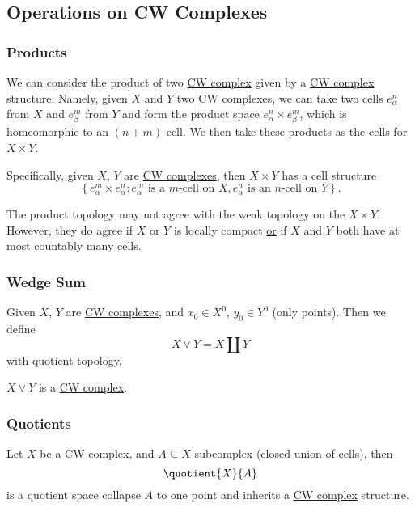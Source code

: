 \subsection{Operations on CW Complexes}
\subsubsection{Products}\label{sssec:Products}
We can consider the product of two \hyperref[def:CW-Complex]{CW complex} given by a \hyperref[def:CW-Complex]{CW complex} structure. Namely, given \(X\) and \(Y\)
two \hyperref[def:CW-Complex]{CW complexes}, we can take two cells \(e^n_{\alpha }\) from \(X\) and \(e^m_{\beta }\) from \(Y\) and
form the product space \(e^n_{\alpha }\times e^m_{\beta }\), which is homeomorphic to an \((n+m)\)-cell. We then
take these products as the cells for \(X\times Y\).

Specifically, given \(X\), \(Y\) are \hyperref[def:CW-Complex]{CW complexes}, then \(X\times Y\) has a cell structure
\[
	\left\{e_{\alpha}^m \times e_{\alpha}^n\colon e^m_{\alpha}\text{ is a \(m\)-cell on \(X\)}, e^n_{\alpha}\text{ is an \(n\)-cell on \(Y\)}\right\}.
\]
\begin{remark}
	The product topology may not agree with the weak topology on the \(X\times Y\). However, they do agree if
	\(X\) or \(Y\) is locally compact \underline{or} if \(X\) and \(Y\) both have at most countably many cells.
\end{remark}

\subsubsection{Wedge Sum}\label{sssec:Wedge-sum}
Given \(X\), \(Y\) are \hyperref[def:CW-Complex]{CW complexes}, and \(x_0\in X^0\), \(y_0\in Y^0\) (only points). Then we define
\[
	X\vee Y = X\coprod Y
\]
with quotient topology.
\begin{remark}
	\(X\lor Y\) is a \hyperref[def:CW-Complex]{CW complex}.
\end{remark}

\subsubsection{Quotients}\label{sssec:Quotients}
Let \(X\) be a \hyperref[def:CW-Complex]{CW complex}, and \(A\subseteq X\) \hyperref[def:CW-subcomplex]{subcomplex} (closed union of cells), then
\[
	\quotient{X}{A}
\]
is a quotient space collapse \(A\) to one point and inherits a \hyperref[def:CW-Complex]{CW complex} structure.

